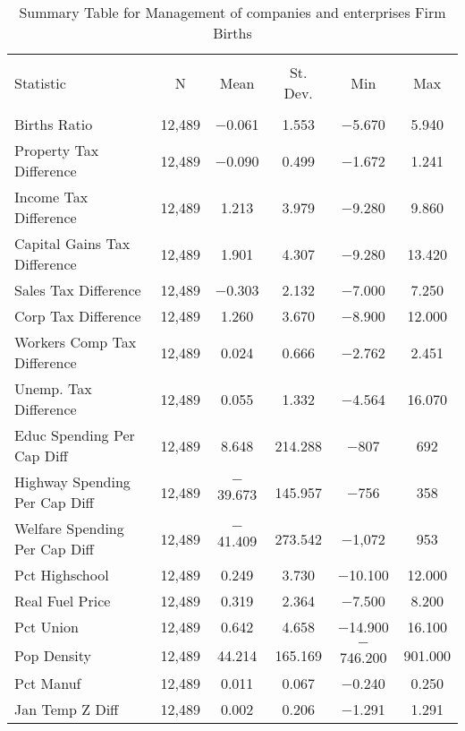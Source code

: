 
\begin{table}[!htbp] \centering 
  \caption{Summary Table for  Management of companies and enterprises Firm Births} 
  \label{55summary} 
\begin{tabular}{@{\extracolsep{5pt}}lccccc} 
\\[-1.8ex]\hline 
\hline \\[-1.8ex] 
Statistic & \multicolumn{1}{c}{N} & \multicolumn{1}{c}{Mean} & \multicolumn{1}{c}{St. Dev.} & \multicolumn{1}{c}{Min} & \multicolumn{1}{c}{Max} \\ 
\hline \\[-1.8ex] 
Births Ratio & 12,489 & $-$0.061 & 1.553 & $-$5.670 & 5.940 \\ 
Property Tax Difference & 12,489 & $-$0.090 & 0.499 & $-$1.672 & 1.241 \\ 
Income Tax Difference & 12,489 & 1.213 & 3.979 & $-$9.280 & 9.860 \\ 
Capital Gains Tax Difference & 12,489 & 1.901 & 4.307 & $-$9.280 & 13.420 \\ 
Sales Tax Difference & 12,489 & $-$0.303 & 2.132 & $-$7.000 & 7.250 \\ 
Corp Tax Difference & 12,489 & 1.260 & 3.670 & $-$8.900 & 12.000 \\ 
Workers Comp Tax Difference & 12,489 & 0.024 & 0.666 & $-$2.762 & 2.451 \\ 
Unemp. Tax Difference & 12,489 & 0.055 & 1.332 & $-$4.564 & 16.070 \\ 
Educ Spending Per Cap Diff & 12,489 & 8.648 & 214.288 & $-$807 & 692 \\ 
Highway Spending Per Cap Diff & 12,489 & $-$39.673 & 145.957 & $-$756 & 358 \\ 
Welfare Spending Per Cap Diff & 12,489 & $-$41.409 & 273.542 & $-$1,072 & 953 \\ 
Pct Highschool & 12,489 & 0.249 & 3.730 & $-$10.100 & 12.000 \\ 
Real Fuel Price & 12,489 & 0.319 & 2.364 & $-$7.500 & 8.200 \\ 
Pct Union & 12,489 & 0.642 & 4.658 & $-$14.900 & 16.100 \\ 
Pop Density & 12,489 & 44.214 & 165.169 & $-$746.200 & 901.000 \\ 
Pct Manuf & 12,489 & 0.011 & 0.067 & $-$0.240 & 0.250 \\ 
Jan Temp Z Diff & 12,489 & 0.002 & 0.206 & $-$1.291 & 1.291 \\ 

\end{tabular}
\end{table}
